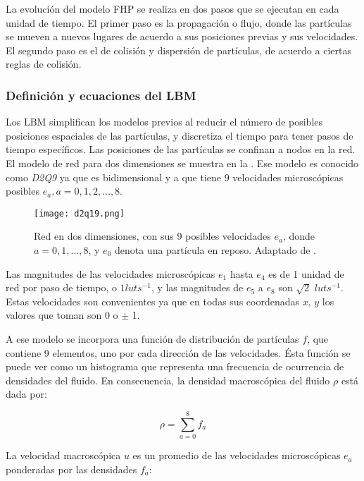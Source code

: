 La evolución del modelo FHP se realiza en dos pasos que se ejecutan en cada unidad de tiempo. El primer paso es la propagación o flujo, donde las partículas se mueven a nuevos lugares de acuerdo a sus posiciones previas y sus velocidades. El segundo paso es el de colisión y dispersión de partículas, de acuerdo a ciertas reglas de colisión.

\subsubsection{Definición y ecuaciones del LBM}

Los LBM simplifican los modelos previos al reducir el número de posibles posiciones espaciales de las partículas, y discretiza el tiempo para tener pasos de tiempo específicos. Las posiciones de las partículas se confinan a nodos en la red. El modelo de red para dos dimensiones se muestra en la . Ese modelo es conocido como \textit{D2Q9} ya que es bidimensional y a que tiene 9 velocidades microscópicas posibles $e_a, a=0,1,2,\dots,8$.

\begin{figure}[!ht]
	\centering
		\texttt{[image: d2q19.png]}
	\caption[Red en dos dimensiones para el LBM.]{Red en dos dimensiones, con sus 9 posibles velocidades $e_a$, donde $a = 0,1,\dots,8$, y $e_0$ denota una partícula en reposo. Adaptado de \citep{sukop2006lattice}.}
	\label{fig:d2q19}
\end{figure}

Las magnitudes de las velocidades microscópicas $e_1$ hasta $e_4$ es de 1 unidad de red por paso de tiempo, o $1 lu ts^{-1}$, y las magnitudes de $e_5$ a $e_8$ son $\sqrt{2}$ $lu ts^{-1}$. Estas velocidades son convenientes ya que en todas sus coordenadas $x$, $y$ los valores que toman son 0 o $\pm$ 1.

A ese modelo se incorpora una función de distribución de partículas $f$, que contiene 9 elementos, uno por cada dirección de las velocidades. Ésta función se puede ver como un histograma que representa una frecuencia de ocurrencia de densidades del fluido. En consecuencia, la densidad macroscópica del fluido $\rho$ está dada por:

\begin{equation}
	\rho = \sum_{a=0}^8 f_a
\end{equation}

La velocidad macroscópica $u$ es un promedio de las velocidades microscópicas $e_a$ ponderadas por las densidades $f_a$:

